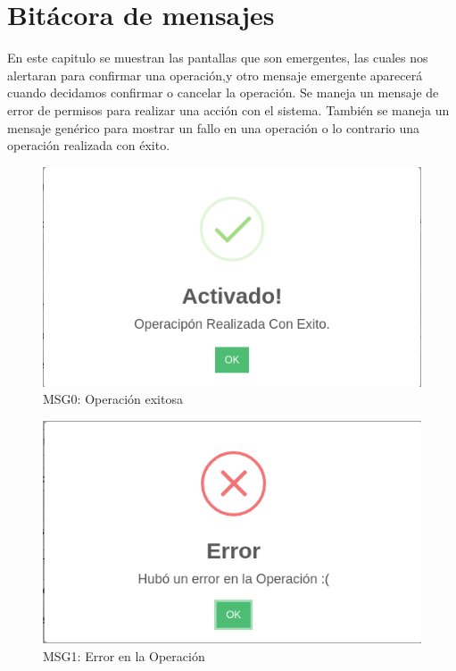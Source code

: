 \chapter{Bitácora de mensajes}
En este capitulo se muestran las pantallas que son emergentes,
las cuales nos alertaran para confirmar una operación,y otro mensaje emergente
aparecerá cuando decidamos confirmar o cancelar la operación.
Se maneja un mensaje de error de permisos para realizar una acción con el sistema.
También se maneja un  mensaje genérico para mostrar un fallo en una operación
o lo contrario una operación realizada con éxito.

\begin{figure}[htbp!]
	\begin{center}
		\includegraphics[width=\textwidth]{Pantallas/OperacionExitosa}
		\caption{MSG0: Operación exitosa}
	\end{center}
\end{figure}



\begin{figure}[htbp!]
	\begin{center}
		\includegraphics[width=\textwidth]{Pantallas/ErrorOperacion}
		\caption{MSG1: Error en la Operación}
	\end{center}
\end{figure}


